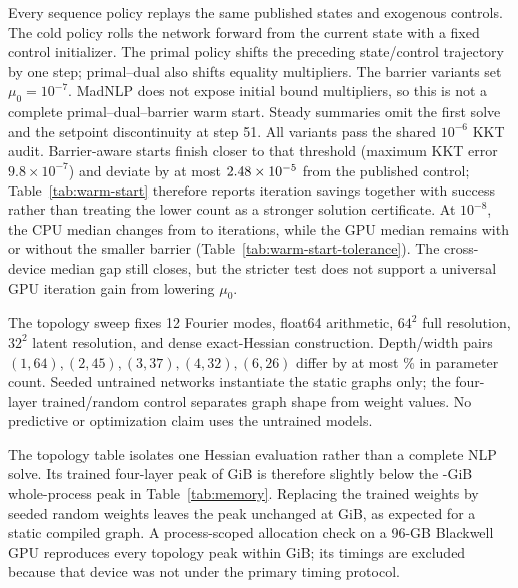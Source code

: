Every sequence policy replays the same published states and exogenous controls.
The cold policy rolls the network forward from the current state with a fixed
control initializer.  The primal policy shifts the preceding state/control
trajectory by one step; primal--dual also shifts equality multipliers.  The
barrier variants set $\mu_0=10^{-7}$.  MadNLP does not expose initial bound
multipliers, so this is not a complete primal--dual--barrier warm start.
Steady summaries omit the first solve and the setpoint discontinuity at step 51.
All variants pass the shared $10^{-6}$ KKT audit.  Barrier-aware starts finish
closer to that threshold (maximum KKT error $9.8\times10^{-7}$) and deviate by
at most $2.48\times 10^{-5}$ from the published control; Table~\ref{tab:warm-start}
therefore reports iteration savings together with success rather than treating
the lower count as a stronger solution certificate.
At $10^{-8}$, the CPU median changes from \PFRStrictCPUPrimalIter{} to
\PFRStrictCPUBarrierIter{} iterations, while the GPU median remains
\PFRStrictGPUPrimalIter{} with or without the smaller barrier
(Table~\ref{tab:warm-start-tolerance}).  The cross-device median gap still
closes, but the stricter test does not support a universal GPU iteration gain
from lowering $\mu_0$.

The topology sweep fixes 12 Fourier modes, float64 arithmetic, $64^2$ full
resolution, $32^2$ latent resolution, and dense exact-Hessian construction.
Depth/width pairs $(1,64),(2,45),(3,37),(4,32),(6,26)$ differ by at most
\FNOShapeMaxParameterMismatch\% in parameter count.  Seeded untrained networks
instantiate the static graphs only; the four-layer trained/random control
separates graph shape from weight values.  No predictive or optimization claim
uses the untrained models.



The topology table isolates one Hessian evaluation rather than a complete NLP
solve.  Its trained four-layer peak of \FNOShapeTrainedMemory{} GiB is therefore
slightly below the \DarcyExactMemory-GiB whole-process peak in
Table~\ref{tab:memory}.  Replacing the trained weights by seeded random weights
leaves the peak unchanged at \FNOShapeRandomMemory{} GiB, as expected for a
static compiled graph.  A process-scoped allocation check on a 96-GB
Blackwell GPU reproduces every topology peak within
\FNOShapeCrossHardwareDelta{} GiB; its timings are excluded because that device
was not under the primary timing protocol.

